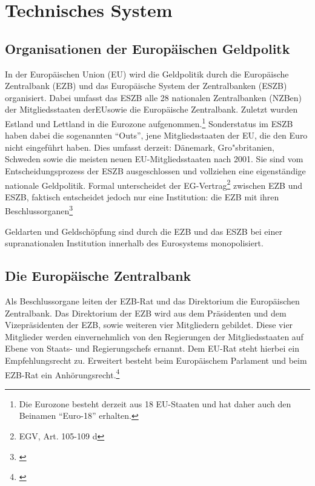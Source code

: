 \documentclass[
        onecolumn,
        a4paper,
        abstracton,
        parskip=half
        ,final
        ]{scrartcl}
\begin{document}
\section{Technisches System}
  \label{sec2:technischesSystem}



\subsection{Organisationen der Europ{\"a}ischen Geldpolitk}

In der Europ{\"a}ischen Union (EU) wird die Geldpolitik durch die Europ{\"a}ische Zentralbank (EZB) und das Europ{\"a}ische System der Zentralbanken (\ac{ESZB}) organisiert. Dabei umfasst das ESZB alle 28 nationalen Zentralbanken (NZBen) der Mitgliedsstaaten der\ac{EU}sowie die Europ{\"a}ische Zentralbank. Zuletzt wurden Estland und Lettland in die Eurozone aufgenommen.\footnote[98]{Die Eurozone besteht derzeit aus 18 EU-Staaten und hat daher auch den Beinamen "`Euro-18"' erhalten.} Sonderstatus im ESZB haben dabei die sogenannten "`Outs"', jene Mitgliedsstaaten der EU, die den Euro nicht eingef{\"u}hrt haben.
Dies umfasst derzeit: D{\"a}nemark, Gro{"s}britanien, Schweden sowie die meisten neuen EU-Mitgliedsstaaten nach 2001. Sie sind vom Entscheidungsprozess der ESZB ausgeschlossen und vollziehen eine eigenst{\"a}ndige nationale Geldpolitik.
Formal unterscheidet der EG-Vertrag\footnote[25]{\ac{EGV}, Art. 105-109 d} zwischen EZB und ESZB, faktisch entscheidet jedoch nur eine Institution: die EZB mit ihren Beschlussorganen\footnote[99]{\citep*[vgl.][S.553]{Basseler2010}}

Geldarten und Geldsch{\"o}pfung sind durch die EZB und das ESZB bei einer supranationalen Institution innerhalb des Eurosystems monopolisiert.



\subsection{Die Europ{\"a}ische Zentralbank}
Als Beschlussorgane leiten der EZB-Rat und das Direktorium die Europ{\"a}ischen Zentralbank. Das Direktorium der \ac{EZB} wird aus dem Pr{\"a}sidenten und dem Vizepr{\"a}sidenten der EZB, sowie weiteren vier Mitgliedern gebildet. Diese vier Mitglieder werden einvernehmlich von den Regierungen der Mitgliedsstaaten auf Ebene von Staats- und Regierungschefs ernannt. Dem EU-Rat steht hierbei ein Empfehlungsrecht zu. Erweitert besteht beim Europ{\"a}ischem Parlament und beim EZB-Rat ein Anh{\"o}rungsrecht.\footnote[46]{\citep*[vgl.][S.553]{Basseler2010}}
\end{document}
